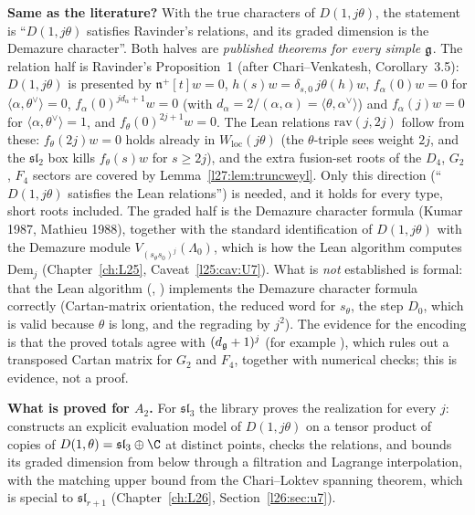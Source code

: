 \begin{dictionary}
\textbf{Same as the literature?} With the true characters of $D(1,j\theta)$, the statement is ``$D(1,j\theta)$ satisfies Ravinder's
relations, and its graded dimension is the Demazure character''. Both halves are \emph{published theorems for every simple
$\mathfrak g$}. The relation half is Ravinder's Proposition~1 (after Chari--Venkatesh, Corollary~3.5): $D(1,j\theta)$ is
presented by $\mathfrak n^+[t]w=0$, $h(s)w=\delta_{s,0}\,j\theta(h)w$, $f_\alpha(0)w=0$ for $\langle\alpha,\theta^\vee\rangle=0$,
$f_\alpha(0)^{jd_\alpha+1}w=0$ (with $d_\alpha=2/(\alpha,\alpha)=\langle\theta,\alpha^\vee\rangle$) and $f_\alpha(j)w=0$ for
$\langle\alpha,\theta^\vee\rangle=1$, and $f_\theta(0)^{2j+1}w=0$. The Lean relations
$\mathrm{rav}(j,2j)$ follow from these: $f_\theta(2j)w=0$ holds already in $W_{\mathrm{loc}}(j\theta)$ (the $\theta$-triple sees
weight $2j$, and the $\mathfrak{sl}_2$ box kills $f_\theta(s)w$ for $s\ge2j$), and the extra fusion-set roots of the $D_4$, $G_2$,
$F_4$ sectors are covered by Lemma~\ref{l27:lem:truncweyl}. Only this direction (``$D(1,j\theta)$ satisfies the Lean relations'')
is needed, and it holds for every type, short roots included. The graded half is the Demazure character formula (Kumar 1987,
Mathieu 1988), together with the standard identification of $D(1,j\theta)$ with the Demazure module
$V_{(s_\theta s_0)^j}(\Lambda_0)$, which is how the Lean algorithm computes $\mathrm{Dem}_j$ (Chapter~\ref{ch:L25},
Caveat~\ref{l25:cav:U7}). What is \emph{not} established is formal: that the Lean algorithm (,
) implements the Demazure character formula correctly (Cartan-matrix orientation, the reduced word for $s_\theta$,
the step $D_0$, which is valid because $\theta$ is long, and the regrading by $j^2$). The evidence for the encoding is that the proved
totals agree with $(d_{\mathfrak g}+1)^j$ (for example ), which rules out a transposed Cartan matrix for
$G_2$ and $F_4$, together with numerical checks; this is evidence, not a proof.
\end{dictionary}

\textbf{What is proved for $A_2$.} For $\mathfrak{sl}_3$ the library proves the realization for every $j$:
 constructs an explicit evaluation model of $D(1,j\theta)$ on a tensor product of copies
of $D(1,\theta)=\mathfrak{sl}_3\oplus\C$ at distinct points, checks the relations, and bounds its graded dimension from below
through a filtration and Lagrange interpolation, with the matching upper bound from the Chari--Loktev spanning theorem, which is
special to $\mathfrak{sl}_{r+1}$ (Chapter~\ref{ch:L26}, Section~\ref{l26:sec:u7}).


